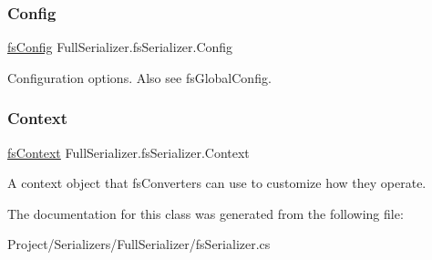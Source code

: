 \subsubsection{\texorpdfstring{Config}{Config}}
{\footnotesize\ttfamily \hyperlink{class_full_serializer_1_1fs_config}{fs\+Config} Full\+Serializer.\+fs\+Serializer.\+Config}



Configuration options. Also see fs\+Global\+Config. 

\mbox{\label{class_full_serializer_1_1fs_serializer_a19a1520594532d7d8bcbcf4f1dac557f}} 
\subsubsection{\texorpdfstring{Context}{Context}}
{\footnotesize\ttfamily \hyperlink{class_full_serializer_1_1fs_context}{fs\+Context} Full\+Serializer.\+fs\+Serializer.\+Context}



A context object that fs\+Converters can use to customize how they operate. 



The documentation for this class was generated from the following file\+:\begin{DoxyCompactItemize}
\item 
Project/\+Serializers/\+Full\+Serializer/fs\+Serializer.\+cs\end{DoxyCompactItemize}
